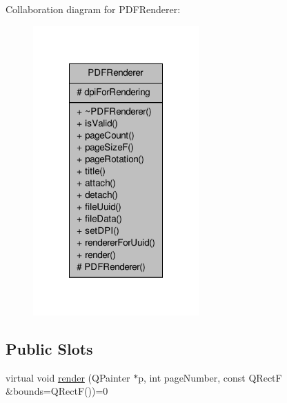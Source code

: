 Collaboration diagram for P\-D\-F\-Renderer\-:
\nopagebreak
\begin{figure}[H]
\begin{center}
\leavevmode
\includegraphics[width=180pt]{d5/dbf/class_p_d_f_renderer__coll__graph}
\end{center}
\end{figure}
\subsection*{Public Slots}
\begin{DoxyCompactItemize}
\item 
virtual void \hyperlink{class_p_d_f_renderer_ab34077fb1f1e5d94150866ba4df335a7}{render} (Q\-Painter $\ast$p, int page\-Number, const Q\-Rect\-F \&bounds=Q\-Rect\-F())=0
\end{DoxyCompactItemize}
